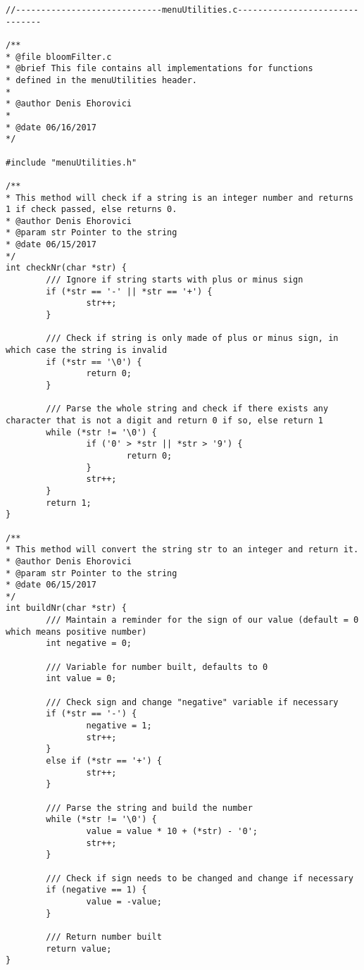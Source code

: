 \documentclass[14pt]{article}
\begin{document}
\begin{lstlisting}
//-----------------------------menuUtilities.c-------------------------------

/**
* @file bloomFilter.c
* @brief This file contains all implementations for functions
* defined in the menuUtilities header.
*
* @author Denis Ehorovici
*
* @date 06/16/2017
*/

#include "menuUtilities.h"

/**
* This method will check if a string is an integer number and returns 1 if check passed, else returns 0.
* @author Denis Ehorovici
* @param str Pointer to the string
* @date 06/15/2017
*/
int checkNr(char *str) {
        /// Ignore if string starts with plus or minus sign
        if (*str == '-' || *str == '+') {
                str++;
        }

        /// Check if string is only made of plus or minus sign, in which case the string is invalid
        if (*str == '\0') {
                return 0;
        }

        /// Parse the whole string and check if there exists any character that is not a digit and return 0 if so, else return 1
        while (*str != '\0') {
                if ('0' > *str || *str > '9') {
                        return 0;
                }
                str++;
        }
        return 1;
}

/**
* This method will convert the string str to an integer and return it.
* @author Denis Ehorovici
* @param str Pointer to the string
* @date 06/15/2017
*/
int buildNr(char *str) {
        /// Maintain a reminder for the sign of our value (default = 0 which means positive number)
        int negative = 0;

        /// Variable for number built, defaults to 0
        int value = 0;

        /// Check sign and change "negative" variable if necessary
        if (*str == '-') {
                negative = 1;
                str++;
        }
        else if (*str == '+') {
                str++;
        }

        /// Parse the string and build the number
        while (*str != '\0') {
                value = value * 10 + (*str) - '0';
                str++;
        }

        /// Check if sign needs to be changed and change if necessary
        if (negative == 1) {
                value = -value;
        }

        /// Return number built
        return value;
}

\end{lstlisting}
\end{document}
